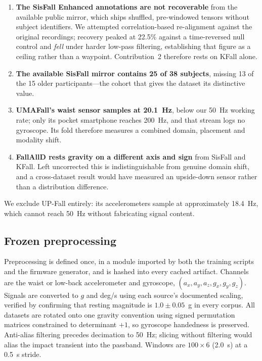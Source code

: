 \documentclass[conference]{IEEEtran}
\begin{document}
\begin{enumerate}
\item \textbf{The SisFall Enhanced annotations are not recoverable} from the available
public mirror, which ships shuffled, pre-windowed tensors without subject identifiers.
We attempted correlation-based re-alignment against the original recordings; recovery
peaked at 22.5\% against a time-reversed null control and \emph{fell} under harder
low-pass filtering, establishing that figure as a ceiling rather than a waypoint.
Contribution~2 therefore rests on KFall alone.
\item \textbf{The available SisFall mirror contains 25 of 38 subjects}, missing 13 of
the 15 older participants---the cohort that gives the dataset its distinctive value.
\item \textbf{UMAFall's waist sensor samples at 20.1~Hz}, below our 50~Hz working
rate; only its pocket smartphone reaches 200~Hz, and that stream logs no gyroscope.
Its fold therefore measures a combined domain, placement and modality shift.
\item \textbf{FallAllD rests gravity on a different axis and sign} from SisFall and
KFall. Left uncorrected this is indistinguishable from genuine domain shift, and a
cross-dataset result would have measured an upside-down sensor rather than a
distribution difference.
\end{enumerate}

We exclude UP-Fall entirely: its accelerometers sample at approximately 18.4~Hz, which
cannot reach 50~Hz without fabricating signal content.

\subsection{Frozen preprocessing}

Preprocessing is defined once, in a module imported by both the training scripts and
the firmware generator, and is hashed into every cached artifact. Channels are the
waist or low-back accelerometer and gyroscope, $(a_x,a_y,a_z,g_x,g_y,g_z)$. Signals
are converted to $g$ and deg/s using each source's documented scaling, verified by
confirming that resting magnitude is $1.0\pm0.05$~g in every corpus. All datasets are
rotated onto one gravity convention using signed permutation matrices constrained to
determinant $+1$, so gyroscope handedness is preserved. Anti-alias filtering precedes
decimation to 50~Hz; slicing without filtering would alias the impact transient into
the passband. Windows are $100\times6$ (2.0~s) at a 0.5~s stride.
\end{document}
